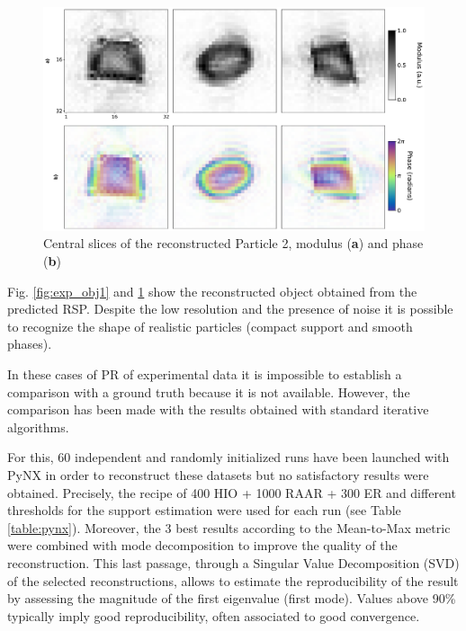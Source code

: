 \begin{figure}[H]
    \centering
    \includegraphics[width=\textwidth]{figures/Phasing/exp_data_rec2.pdf}
    \caption{Central slices of the reconstructed Particle 2, modulus (\textbf{a}) and phase  (\textbf{b})}
    \label{fig:exp_obj2}
\end{figure}

Fig. \ref{fig:exp_obj1} and \ref{fig:exp_obj2} show the reconstructed object obtained from the predicted RSP. Despite the 
low resolution and the presence of noise it is possible to recognize the shape of realistic particles (compact support 
and smooth phases).

In these cases of PR of experimental data it is impossible to establish a comparison with a ground truth because it 
is not available. However, the comparison has been made with the results obtained with standard iterative algorithms.
 
For this, 60 independent and randomly initialized runs have been launched with PyNX in order to reconstruct these datasets 
but no satisfactory results were obtained. Precisely, the recipe of 400 HIO + 1000 RAAR + 300 ER and different thresholds 
for the support estimation were used for each run (see Table \ref{table:pynx}). Moreover, the 3 best results according 
to the Mean-to-Max metric  \cite{Frisch2023CuAgCatalysts, Grimes2024CatalystStrain} were combined with mode decomposition 
\cite{favre-nicolin_free_2020} to improve the quality of the reconstruction. This last passage, through a Singular 
Value Decomposition (SVD) of the selected reconstructions, allows to estimate the reproducibility of the result by 
assessing the magnitude of the first eigenvalue (first mode). Values above 90\% typically imply good reproducibility, 
often associated to good convergence. 

